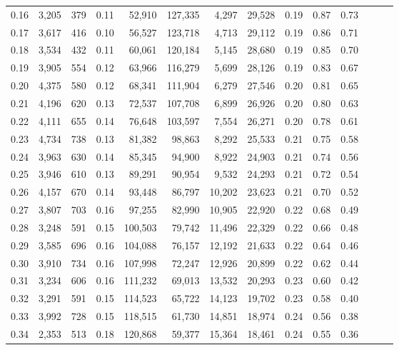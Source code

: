 \begin{tabular}{rrrrrrrrrrrrrr}
0.16 &  3,205 &  379 &  0.11 &   52,910 &  127,335 &   4,297 &  29,528 &  0.19 &  0.87 &      0.73 \\
0.17 &  3,617 &  416 &  0.10 &   56,527 &  123,718 &   4,713 &  29,112 &  0.19 &  0.86 &      0.71 \\
0.18 &  3,534 &  432 &  0.11 &   60,061 &  120,184 &   5,145 &  28,680 &  0.19 &  0.85 &      0.70 \\
0.19 &  3,905 &  554 &  0.12 &   63,966 &  116,279 &   5,699 &  28,126 &  0.19 &  0.83 &      0.67 \\
0.20 &  4,375 &  580 &  0.12 &   68,341 &  111,904 &   6,279 &  27,546 &  0.20 &  0.81 &      0.65 \\
0.21 &  4,196 &  620 &  0.13 &   72,537 &  107,708 &   6,899 &  26,926 &  0.20 &  0.80 &      0.63 \\
0.22 &  4,111 &  655 &  0.14 &   76,648 &  103,597 &   7,554 &  26,271 &  0.20 &  0.78 &      0.61 \\
0.23 &  4,734 &  738 &  0.13 &   81,382 &   98,863 &   8,292 &  25,533 &  0.21 &  0.75 &      0.58 \\
0.24 &  3,963 &  630 &  0.14 &   85,345 &   94,900 &   8,922 &  24,903 &  0.21 &  0.74 &      0.56 \\
0.25 &  3,946 &  610 &  0.13 &   89,291 &   90,954 &   9,532 &  24,293 &  0.21 &  0.72 &      0.54 \\
0.26 &  4,157 &  670 &  0.14 &   93,448 &   86,797 &  10,202 &  23,623 &  0.21 &  0.70 &      0.52 \\
0.27 &  3,807 &  703 &  0.16 &   97,255 &   82,990 &  10,905 &  22,920 &  0.22 &  0.68 &      0.49 \\
0.28 &  3,248 &  591 &  0.15 &  100,503 &   79,742 &  11,496 &  22,329 &  0.22 &  0.66 &      0.48 \\
0.29 &  3,585 &  696 &  0.16 &  104,088 &   76,157 &  12,192 &  21,633 &  0.22 &  0.64 &      0.46 \\
0.30 &  3,910 &  734 &  0.16 &  107,998 &   72,247 &  12,926 &  20,899 &  0.22 &  0.62 &      0.44 \\
0.31 &  3,234 &  606 &  0.16 &  111,232 &   69,013 &  13,532 &  20,293 &  0.23 &  0.60 &      0.42 \\
0.32 &  3,291 &  591 &  0.15 &  114,523 &   65,722 &  14,123 &  19,702 &  0.23 &  0.58 &      0.40 \\
0.33 &  3,992 &  728 &  0.15 &  118,515 &   61,730 &  14,851 &  18,974 &  0.24 &  0.56 &      0.38 \\
0.34 &  2,353 &  513 &  0.18 &  120,868 &   59,377 &  15,364 &  18,461 &  0.24 &  0.55 &      0.36 \\

\end{tabular}
